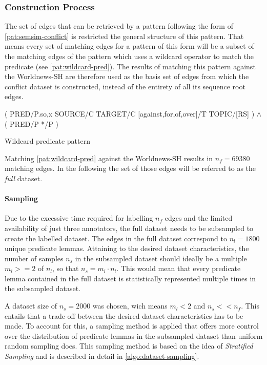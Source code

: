 \documentclass[11pt]{scrreprt}
\let\cite\parencite  %
\begin{document}
\subsubsection{Construction Process}
The set of edges that can be retrieved by a pattern following the form of \cref{pat:semsim-conflict} is restricted the general structure of this pattern.
That means every set of matching edges for a pattern of this form will be a subset of the matching edges of the pattern which uses a wildcard operator to match the predicate (see \cref{pat:wildcard-pred}). The results of matching this pattern against the Worldnews-SH are therefore used as the basis set of edges from which the conflict dataset is constructed, instead of the entirety of all its sequence root edges.

\begin{pattern}
  \normalfont\sffamily
  \centering
  ( PRED/P.{so,x} SOURCE/C TARGET/C [against,for,of,over]/T TOPIC/[RS] ) \(\wedge\) \\ ( PRED/P */P )
  \caption{Wildcard predicate pattern}
  \label{pat:wildcard-pred}
\end{pattern}

Matching \cref{pat:wildcard-pred} against the Worldnews-SH results in \(n_{f} = 69 380\) matching edges. In the following the set of those edges will be referred to as the \textit{full} dataset.

\paragraph{Sampling} Due to the excessive time required for labelling \(n_f\) edges and the limited availability of just three annotators, the full dataset needs to be subsampled to create the labelled dataset. The edges in the full dataset correspond to \(n_{l} = 1800\) unique predicate lemmas. Attaining to the desired dataset characteristics, the number of samples \(n_{s}\) in the subsampled dataset should ideally be a multiple \(m_{l} >= 2\) of \(n_{l}\), so that \(n_{s} = m_{l} \cdot  n_{l}\). This would mean that every  predicate lemma contained in the full dataset is statistically represented multiple times in the subsampled dataset.

A dataset size of \(n_{s}=2000\) was chosen, wich means \(m_{l} < 2\) and  \(n_s << n_f\). This entails that a trade-off between the desired dataset characteristics has to be made. To account for this, a sampling method is applied that offers more control over the distribution of predicate lemmas in the subsampled dataset than uniform random sampling does. This sampling method is based on the idea of \textit{Stratified Sampling} \cite{parsonsStratifiedSampling2017}  and is described in detail in \cref{algo:dataset-sampling}. 
\end{document}
